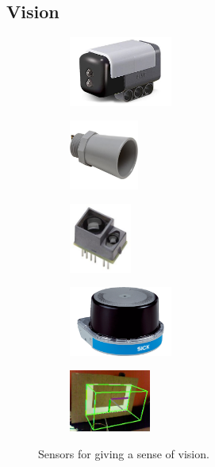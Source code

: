 \subsection{Vision}

\begin{figure}[H]
\begin{subfigure}[b]{.19\linewidth}
\includegraphics[height=0.9in]{imgs/sensor_color.jpeg}
\end{subfigure}\begin{subfigure}[b]{.19\linewidth}
\includegraphics[height=0.9in]{imgs/sensor_ultrasonic.jpeg}
\end{subfigure}\begin{subfigure}[b]{.19\linewidth}
\includegraphics[height=0.9in]{imgs/sensor_tof.jpeg}
\end{subfigure}\begin{subfigure}[b]{.19\linewidth}
\includegraphics[height=0.9in]{imgs/sensor_lidar.png}
\end{subfigure}\begin{subfigure}[b]{.19\linewidth}
\includegraphics[height=0.8in]{imgs/sensor_cv.png}
\end{subfigure}
\caption{Sensors for giving a sense of vision.}
\end{figure}

